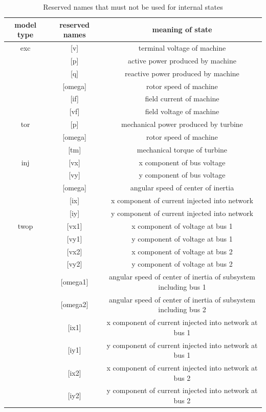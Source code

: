 \begin{table}[t]
\centering
\caption{Reserved names that must not be used for internal states}\label{tab-reserved_names}
\begin{tabular}{|c|c|c|}
\hline
model type & reserved names & meaning of state \\ \hline \hline
exc & [v] & terminal voltage of machine \\
    & [p] & active power produced by machine \\
    & [q] & reactive power produced by machine \\
    & [omega] & rotor speed of machine \\
    & [if] & field current of machine \\
    & [vf] & field voltage of machine \\ \hline
tor & [p] & mechanical power produced by turbine \\
    & [omega] & rotor speed of machine \\
    & [tm] & mechanical torque of turbine \\ \hline
inj & [vx] & x component of bus voltage \\
    & [vy] & y component of bus voltage \\
    & [omega] & angular speed of center of inertia \\
    & [ix] & x component of current injected into network \\
    & [iy] & y component of current injected into network \\ \hline
twop & [vx1] & x component of voltage at bus 1 \\
    & [vy1] & y component of voltage at bus 1 \\
    & [vx2] & x component of voltage at bus 2 \\
    & [vy2] & y component of voltage at bus 2 \\
    & [omega1] & angular speed of center of inertia of subsystem including bus 1 \\
    & [omega2] & angular speed of center of inertia of subsystem including bus 2 \\
    & [ix1] & x component of current injected into network at bus 1 \\
    & [iy1] & y component of current injected into network at bus 1 \\
    & [ix2] & x component of current injected into network at bus 2 \\
    & [iy2] & y component of current injected into network at bus 2 \\ \hline
\end{tabular}
\end{table}

